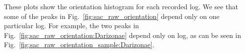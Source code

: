 These plots show the orientation histogram for each recorded log. We see that some of the peaks in Fig.~\ref{fig:sac_raw_orientation} depend only on one particular log.
For example, the two peaks in Fig.~\ref{fig:sac_raw_orientation:Darizonae} depend only on log, as can be seen in Fig.~\ref{fig:sac_raw_orientation_sample:Darizonae}.